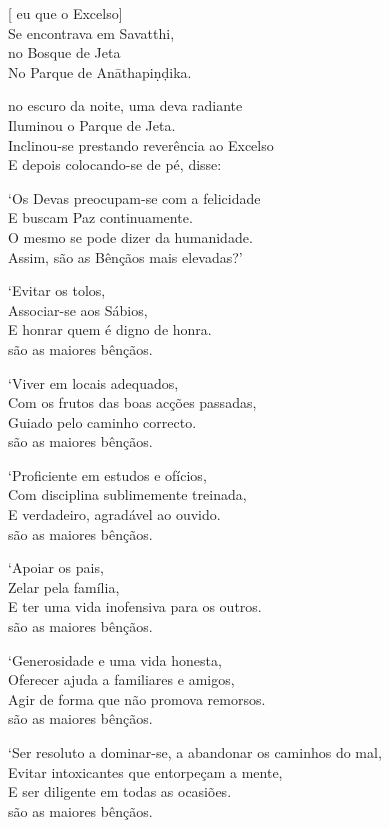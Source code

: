 [ eu  que o Excelso]\\
Se encontrava em Savatthi,\\
 no Bosque de Jeta\\
No Parque de Anāthapiṇḍika.

 no escuro da noite, uma deva radiante\\
Iluminou  o Parque de Jeta.\\
Inclinou-se prestando reverência ao Excelso\\
E depois colocando-se de pé, disse:

`Os Devas preocupam-se com a felicidade\\
E buscam Paz continuamente.\\
O mesmo se pode dizer da humanidade.\\
Assim,  são as Bênçãos mais elevadas?'

`Evitar os tolos,\\
Associar-se aos Sábios,\\
E honrar quem é digno de honra.\\
 são as maiores bênçãos.

`Viver em locais adequados,\\
Com os frutos das boas acções passadas,\\
Guiado pelo caminho correcto.\\
 são as maiores bênçãos.

\clearpage

`Proficiente em estudos e ofícios,\\
Com disciplina sublimemente treinada,\\
E  verdadeiro, agradável ao ouvido.\\
 são as maiores bênçãos.

`Apoiar os pais,\\
Zelar pela família,\\
E ter uma vida inofensiva para os outros.\\
 são as maiores bênçãos.

`Generosidade e uma vida honesta,\\
Oferecer ajuda a familiares e amigos,\\
Agir de forma que não promova remorsos.\\
 são as maiores bênçãos.

`Ser resoluto a dominar-se, a abandonar os caminhos do mal,\\
Evitar intoxicantes que entorpeçam a mente,\\
E ser diligente em todas as ocasiões.\\
 são as maiores bênçãos.

